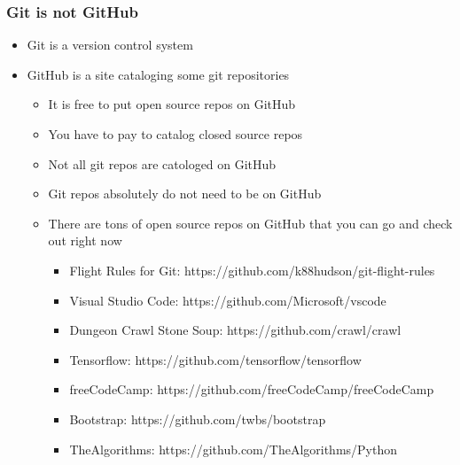 \documentclass[unknownkeysallowed]{beamer}
\begin{document}
\begin{frame}
    \frametitle{Git is not GitHub}
    \begin{itemize}
        \item{Git is a version control system}
        \item{GitHub is a site cataloging some git repositories}
            \begin{itemize}
                \item{It is free to put open source repos on GitHub}
                \item{You have to pay to catalog closed source repos}
                \item{Not all git repos are catologed on GitHub}
                \item{Git repos absolutely do not need to be on GitHub}
                \item{There are tons of open source repos on GitHub that you can go and check out right now}
                \begin{itemize}
                  \item{Flight Rules for Git: https://github.com/k88hudson/git-flight-rules}
                  \item{Visual Studio Code: https://github.com/Microsoft/vscode}
                  \item{Dungeon Crawl Stone Soup: https://github.com/crawl/crawl}
                  \item{Tensorflow: https://github.com/tensorflow/tensorflow}
                  \item{freeCodeCamp: https://github.com/freeCodeCamp/freeCodeCamp}
                  \item{Bootstrap: https://github.com/twbs/bootstrap}
                  \item{TheAlgorithms: https://github.com/TheAlgorithms/Python}
                \end{itemize}
           \end{itemize}
    \end{itemize}
    \vspace{1cm} %
\end{frame}
\end{document}
